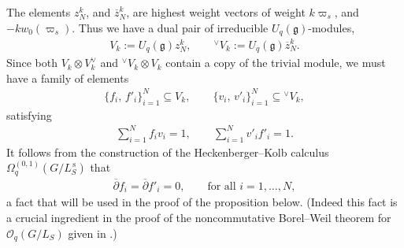 \documentclass[10pt,a4paper]{amsart}
\numberwithin{equation}{section}
\newcommand\adel{\overline{\partial}}
\begin{document}
The elements $z_{N}^k$, and $\overline{z}_{N}^k$, are highest weight vectors of weight $k\varpi_s$, and $-kw_0(\varpi_s)$. Thus we have a dual pair of irreducible $U_q(\mathfrak{g})$-modules,
\begin{gather*}
V_k:= U_q(\mathfrak{g})z^k_N, \qquad {}^{\vee}V_k := U_q(\mathfrak{g})\overline{z}_N^k.
\end{gather*}
Since both $V_k \otimes V_k^{\vee}$ and ${}^{\vee}V_k \otimes V_k$ contain a copy of the trivial module, we must have a family of elements
\begin{gather*} %
\{f_{i}, \, f'_{i}\}_{i=1}^{N} \subseteq V_k, \qquad \{v_i, \, v'_i\}_{i=1}^{N} \subseteq {}^{\vee}V_k,
\end{gather*}
satisfying
\begin{gather}\label{eqn:genDet}
\sum_{i=1}^{N} f_iv_i = 1, \qquad \sum_{i=1}^{N} v'_if'_i = 1.
\end{gather}
It follows from the construction of the Heckenberger--Kolb calculus $\Omega^{(0,1)}_q(G/L_S^{\,\mathrm{s}})$ that
\begin{align} \label{eqn:holof}
\adel f_i = \adel f'_i = 0, \qquad \textrm{for all } i = 1, \dots, N,
\end{align}
a fact that will be used in the proof of the proposition below. (Indeed this fact is a crucial ingredient in the proof of the noncommutative Borel--Weil theorem for $\mathcal{O}_q(G/L_S)$ given in \cite{CDOBBW}.)
\end{document}
